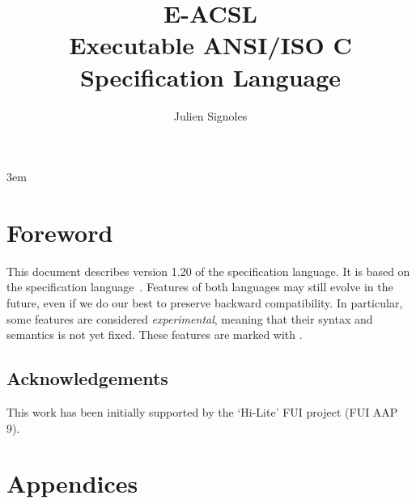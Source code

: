 \documentclass{frama-c-book}
\title{
  \huge %
  E-ACSL \\
  \medskip
  Executable ANSI/ISO C Specification Language
}
\author{Julien Signoles}
\newcommand{\eacsllangversion}{1.20\xspace}
\newcommand{\version}{\eacsllangversion\xspace}
\begin{document}
\sloppy
\emergencystretch 3em

\maketitle

\cleardoublepage
{}
\label{chap:contents}
\tableofcontents

\chapter*{Foreword}

This document describes version \version of the \eacsl specification
language. It is based on the \acsl specification language~\cite{acsl}. Features
of both languages may still evolve in the future, even if we do our best to
preserve backward compatibility. In particular, some features are considered
\emph{experimental}, meaning that their syntax and semantics is not yet fixed.
These features are marked with \experimental.

\section*{Acknowledgements}

\insertpeople

\medskip

This work has been initially supported by the ‘Hi-Lite’ FUI project (FUI AAP 9).










\appendix

\chapter{Appendices}
\label{chap:appendix}



\cleardoublepage
{}



\cleardoublepage
{}
\listoffigures

\cleardoublepage
{}
\printindex
\end{document}
